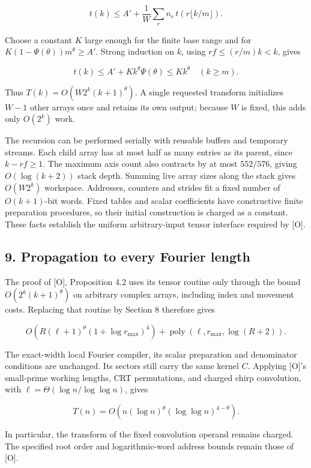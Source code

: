 \documentclass[
  11pt,
]{article}
\begin{document}
\[
 t(k)\le A'+\frac1W\sum_r n_r\,t(r\lfloor k/m\rfloor).
 \tag{8.2}
\]

Choose a constant \(K\) large enough for the finite base range and for
\(K(1-\Psi(\theta))m^\theta\ge A\prime\). Strong induction on \(k\),
using \(rf\le(r/m)k<k\), gives

\[
 t(k)\le A'+Kk^\theta\Psi(\theta)\le Kk^\theta
 \quad(k\ge m).
\]

Thus \(T(k)=O(W2^k(k+1)^\theta)\). A single requested transform
initializes \(W-1\) other arrays once and retains its own output;
because \(W\) is fixed, this adds only \(O(2^k)\) work.

The recursion can be performed serially with reusable buffers and
temporary streams. Each child array has at most half as many entries as
its parent, since \(k-rf\ge1\). The maximum axis count also contracts by
at most \(552/576\), giving \(O(\log(k+2))\) stack depth. Summing live
array sizes along the stack gives \(O(W2^k)\) workspace. Addresses,
counters and strides fit a fixed number of \(O(k+1)\)-bit words. Fixed
tables and scalar coefficients have constructive finite preparation
procedures, so their initial construction is charged as a constant.
These facts establish the uniform arbitrary-input tensor interface
required by {[}O{]}.

\subsection{9. Propagation to every Fourier
length}\label{propagation-to-every-fourier-length}

The proof of {[}O{]}, Proposition 4.2 uses its tensor routine only
through the bound \(O(2^k(k+1)^\theta)\) on arbitrary complex arrays,
including index and movement costs. Replacing that routine by Section 8
therefore gives

\[
 O\!\left(R(\ell+1)^\theta(1+\log r_{\max})^4\right)
 +\operatorname{poly}(\ell,r_{\max},\log(R+2)).
\]

The exact-width local Fourier compiler, its scalar preparation and
denominator conditions are unchanged. Its sectors still carry the same
kernel \(C\). Applying {[}O{]}'s small-prime working lengths, CRT
permutations, and charged chirp convolution, with
\(\ell=\Theta(\log n/\log\log n)\), gives

\[
 T(n)=O\!\left(n(\log n)^\theta(\log\log n)^{4-\theta}\right).
 \tag{9.1}
\]

In particular, the transform of the fixed convolution operand remains
charged. The specified root order and logarithmic-word address bounds
remain those of {[}O{]}.
\end{document}
